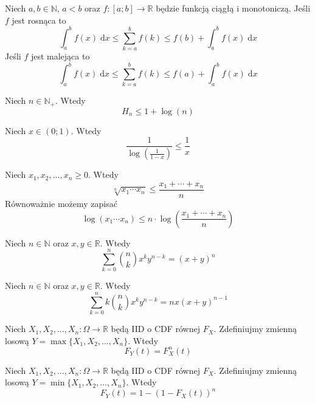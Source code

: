 \begin{fact}\label{F:approximation_of_sum_by_an_integral}
Niech $a,b\in\mathbb{N}$, $a<b$ oraz $f:[a;b]\to\mathbb{R}$ będzie funkcją ciągłą i monotoniczą.
Jeśli $f$ jest rosnąca to
\[
    \int_{a}^b f(x)\; \mathrm{d}x \le \sum_{k=a}^{b} f(k)\le f(b) + \int_{a}^b f(x)\; \mathrm{d}x
\]
Jeśli $f$ jest malejąca to 
\[
    \int_{a}^b f(x)\; \mathrm{d}x \le \sum_{k=a}^{b} f(k)\le f(a) + \int_{a}^b f(x)\; \mathrm{d}x
\]
\end{fact}

\begin{fact}\label{F:harmonic_upper_bound}
Niech $n\in\mathbb{N}_+$. Wtedy
\[
    H_n \le 1 + \log(n)
\]
\end{fact}

\begin{fact}\label{F:log_vs_x}
Niech $x \in (0;1)$. Wtedy
\[
    \frac{1}{\log(\frac{1}{1-x})} \le \frac{1}{x}
\]
\end{fact}

\begin{fact}\label{F:AM_GM}
Niech $x_1,x_2,\dots,x_n\ge 0$. Wtedy
\[
    \sqrt[n]{x_1\cdots x_n} \le \frac{x_1  + \cdots + x_n}{n}
\]
Równoważnie możemy zapisać
\[
    \log(x_1\cdots x_n) \le n\cdot \log\left(\frac{x_1 + \cdots + x_n}{n}\right)
\]
\end{fact}

\begin{fact}\label{F:binomial_0}
Niech $n\in\mathbb{N}$ oraz $x,y\in\mathbb{R}$. Wtedy
\[
    \sum_{k=0}^{n} \binom{n}{k} x^k y^{n-k}= (x+y)^n
\]
\end{fact}

\begin{fact}\label{F:binomial_1}
Niech $n\in\mathbb{N}$ oraz $x,y\in\mathbb{R}$. Wtedy
\[
    \sum_{k=0}^{n} k\binom{n}{k} x^k y^{n-k} = nx(x+y)^{n-1}
\]
\end{fact}

\begin{fact}\label{F:max_CDF}
Niech $X_1,X_2,\dots, X_n:\Omega\to\mathbb{R}$ będą IID o CDF równej $F_X$. Zdefiniujmy zmienną losową $Y = \max\{X_1,X_2,\dots, X_n\}$. Wtedy 
\[
    F_Y(t)=F_X^n(t)
\]
\end{fact}

\begin{fact}\label{F:min_CDF}
Niech $X_1,X_2,\dots, X_n:\Omega\to\mathbb{R}$ będą IID o CDF równej $F_X$. Zdefiniujmy zmienną losową $Y = \min\{X_1,X_2,\dots, X_n\}$. Wtedy 
\[
    F_Y(t)=1-(1-F_X(t))^n
\]
\end{fact}

